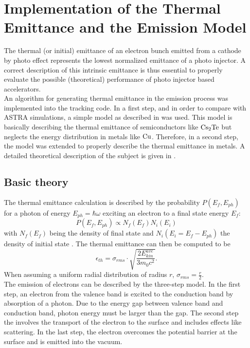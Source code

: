 \documentclass{psi-note}    %
\begin{document}
{\section{Implementation of the Thermal Emittance and the Emission Model} \label{app:emission}
The thermal (or initial) emittance of an electron bunch emitted from a cathode
by photo effect represents the lowest normalized emittance of a photo injector.
A correct description of this intrinsic emittance is thus essential to properly
evaluate the possible (theoretical) performance of photo injector based
accelerators. \\
An algorithm for generating thermal emittance in the emission process was
implemented into the \opalt \cite{OPAL} tracking code.
In a first step, and in order to compare with ASTRA \cite{ASTRA} simulations, a
simple model as described in \cite{KLAUS} was used. This model is basically
describing the thermal emittance of semiconductors like $\rm{Cs_2 Te}$ but
neglects the energy distribution in metals like $\rm{Cu}$. Therefore, in a
second step, the model was extended to properly describe the thermal emittance
in metals. A detailed theoretical description of the subject is given in
\cite{DAVE}.\\

\subsection{Basic theory}
The thermal emittance calculation is described by the probability
$P(E_f,E_{ph})$ for a photon of energy $E_{ph}=\hbar\omega$ exciting an electron
to a final state energy $E_f$: $$P(E_f,E_{ph}) \propto N_f(E_f) N_i(E_i)$$ with
$N_f(E_f)$ being the density of final state and $N_i(E_i = E_f - E_{ph})$ the
density of initial state \cite{KLAUS}. The thermal emittance can then be
computed to be \cite{DAVE} $$\epsilon_{th} = \sigma_{rms} \cdot \sqrt{\frac{2
E_{kin}^{ave}}{3 m_0 c^2}} .$$ When assuming a uniform radial distribution of
radius $r$, $\sigma_{rms} = \frac{r}{2}$.\\
The emission of electrons can be described by the three-step model. In the first
step, an electron from the valence band is excited to the conduction band by
absorption of a photon. Due to the energy gap between valence band and
conduction band, photon energy must be larger than the gap. The second step  the
involves the transport of the electron to the surface and includes effects like
scattering. In the last step, the electron overcomes the potential barrier at
the surface and is emitted into the vacuum.

}
\end{document}
